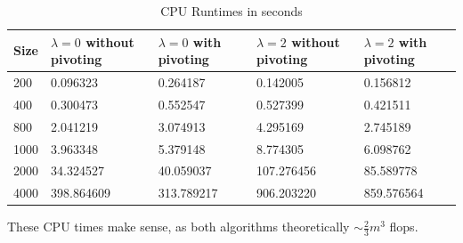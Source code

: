 \documentclass{article}
\begin{document}
\begin{table}[H]
\centering
\caption{CPU Runtimes in seconds}
\begin{tabular}{|l|l|l|l|l|}
\hline
Size & $\lambda = 0$ without pivoting & $\lambda = 0$ with pivoting & $\lambda = 2$ without pivoting & $\lambda = 2$ with pivoting \\
\hline\hline
200 & 0.096323 & 0.264187 & 0.142005 & 0.156812 \\
\hline
400 & 0.300473 & 0.552547 & 0.527399 & 0.421511 \\
\hline
800 & 2.041219 & 3.074913 & 4.295169 & 2.745189 \\
\hline
1000 & 3.963348 & 5.379148 & 8.774305 & 6.098762 \\
\hline
2000 & 34.324527 & 40.059037 & 107.276456 & 85.589778 \\
\hline
4000 & 398.864609 & 313.789217 & 906.203220 & 859.576564\\
\hline
\end{tabular}
\end{table}

These CPU times make sense, as both algorithms theoretically $\sim\frac{2}{3}m^3$ flops.
\end{document}

